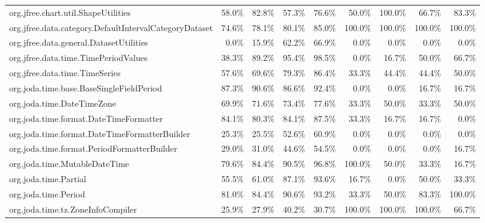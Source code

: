 \begin{tabular}{ l rrrr rrrr}
org.jfree.chart.util.ShapeUtilities &  58.0\% &  82.8\% &  57.3\% &  76.6\% &  50.0\% &  100.0\% &  66.7\% &  83.3\%\\ 
org.jfree.data.category.DefaultIntervalCategoryDataset &  74.6\% &  78.1\% &  80.1\% &  85.0\% &  100.0\% &  100.0\% &  100.0\% &  100.0\%\\ 
org.jfree.data.general.DatasetUtilities &  0.0\% &  15.9\% &  62.2\% &  66.9\% &  0.0\% &  0.0\% &  0.0\% &  0.0\%\\ 
org.jfree.data.time.TimePeriodValues &  38.3\% &  89.2\% &  95.4\% &  98.5\% &  0.0\% &  16.7\% &  50.0\% &  66.7\%\\ 
org.jfree.data.time.TimeSeries &  57.6\% &  69.6\% &  79.3\% &  86.4\% &  33.3\% &  44.4\% &  44.4\% &  50.0\%\\ 
org.joda.time.base.BaseSingleFieldPeriod &  87.3\% &  90.6\% &  86.6\% &  92.4\% &  0.0\% &  0.0\% &  16.7\% &  16.7\%\\ 
org.joda.time.DateTimeZone &  69.9\% &  71.6\% &  73.4\% &  77.6\% &  33.3\% &  50.0\% &  33.3\% &  50.0\%\\ 
org.joda.time.format.DateTimeFormatter &  84.1\% &  80.3\% &  84.1\% &  87.5\% &  33.3\% &  16.7\% &  16.7\% &  0.0\%\\ 
org.joda.time.format.DateTimeFormatterBuilder &  25.3\% &  25.5\% &  52.6\% &  60.9\% &  0.0\% &  0.0\% &  0.0\% &  0.0\%\\ 
org.joda.time.format.PeriodFormatterBuilder &  29.0\% &  31.0\% &  44.6\% &  54.5\% &  0.0\% &  0.0\% &  0.0\% &  16.7\%\\ 
org.joda.time.MutableDateTime &  79.6\% &  84.4\% &  90.5\% &  96.8\% &  100.0\% &  50.0\% &  33.3\% &  16.7\%\\ 
org.joda.time.Partial &  55.5\% &  61.0\% &  87.1\% &  93.6\% &  16.7\% &  0.0\% &  50.0\% &  33.3\%\\ 
org.joda.time.Period &  81.0\% &  84.4\% &  90.6\% &  93.2\% &  33.3\% &  50.0\% &  83.3\% &  100.0\%\\ 
org.joda.time.tz.ZoneInfoCompiler &  25.9\% &  27.9\% &  40.2\% &  30.7\% &  100.0\% &  100.0\% &  100.0\% &  66.7\%\\ 
\bottomrule 
\end{tabular} 
